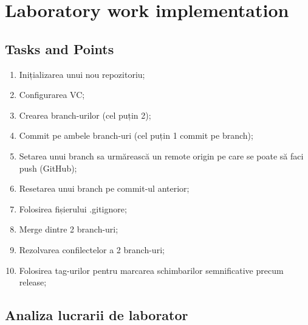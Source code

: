 \section{Laboratory work implementation}

\subsection{Tasks and Points}

\begin{enumerate}
\item Inițializarea unui nou repozitoriu;
\item Configurarea VC;
\item Crearea branch-urilor (cel puțin 2);
\item Commit pe ambele branch-uri (cel puțin 1 commit pe branch);
\item Setarea unui branch sa urmărească un remote origin pe care se poate să faci push (GitHub);
\item Resetarea unui branch pe commit-ul anterior;
\item Folosirea fișierului .gitignore;
\item Merge dintre 2 branch-uri;
\item Rezolvarea confilectelor a 2 branch-uri;
\item Folosirea tag-urilor pentru marcarea schimbarilor semnificative precum release;
\end{enumerate}

\subsection{Analiza lucrarii de laborator}

